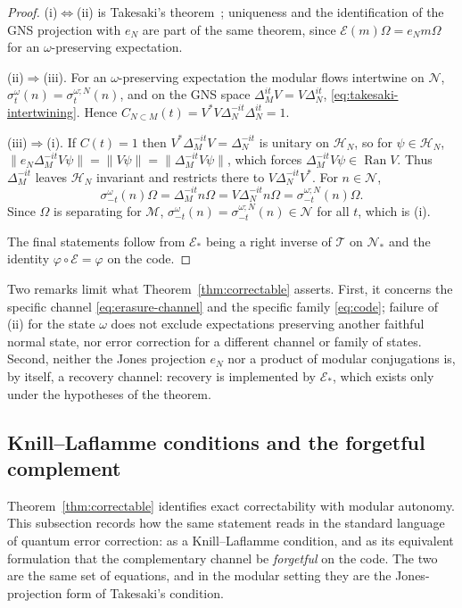 \documentclass[a4paper,11pt]{article}
\theoremstyle{definition}
\newcommand{\mE}{\mathcal{E}}
\begin{document}
\begin{proof}
(i)$\Leftrightarrow$(ii) is Takesaki's theorem~\cite{Takesaki1972}; uniqueness and the identification of the GNS projection with $e_N$ are part of the same theorem, since $\mE(m)\Omega=e_Nm\Omega$ for an $\omega$-preserving expectation.

(ii)$\Rightarrow$(iii). For an $\omega$-preserving expectation the modular flows intertwine on $\mathcal N$,
$\sigma^{\omega}_t(n)=\sigma^{\omega;N}_t(n)$, and on the GNS space
$\Delta_M^{it}V=V\Delta_N^{it}$, \eqref{eq:takesaki-intertwining}. Hence
$C_{N\subset M}(t)=V^*V\Delta_N^{-it}\Delta_N^{it}=1$.

(iii)$\Rightarrow$(i). If $C(t)=1$ then $V^*\Delta_M^{-it}V=\Delta_N^{-it}$ is unitary on $\mathcal H_N$, so for $\psi\in\mathcal H_N$,
$\|e_N\Delta_M^{-it}V\psi\|=\|V\psi\|=\|\Delta_M^{-it}V\psi\|$,
which forces $\Delta_M^{-it}V\psi\in\operatorname{Ran}V$. Thus $\Delta_M^{-it}$ leaves $\mathcal H_N$ invariant and restricts there to $V\Delta_N^{-it}V^*$. For $n\in\mathcal N$,
\[
 \sigma^{\omega}_{-t}(n)\Omega=\Delta_M^{-it}n\Omega
 =V\Delta_N^{-it}n\Omega=\sigma^{\omega;N}_{-t}(n)\Omega .
\]
Since $\Omega$ is separating for $\mathcal M$, $\sigma^{\omega}_{-t}(n)=\sigma^{\omega;N}_{-t}(n)\in\mathcal N$ for all $t$, which is (i).

The final statements follow from $\mE_*$ being a right inverse of $\mathcal T$ on $\mathcal N_*$ and the identity $\varphi\circ\mE=\varphi$ on the code.
\end{proof}

Two remarks limit what Theorem~\ref{thm:correctable} asserts. First, it concerns the specific channel \eqref{eq:erasure-channel} and the specific family \eqref{eq:code}; failure of (ii) for the state $\omega$ does not exclude expectations preserving another faithful normal state, nor error correction for a different channel or family of states. Second, neither the Jones projection $e_N$ nor a product of modular conjugations is, by itself, a recovery channel: recovery is implemented by $\mE_*$, which exists only under the hypotheses of the theorem.



\subsection{Knill--Laflamme conditions and the forgetful complement}\label{subsec:QEC-KL}

Theorem~\ref{thm:correctable} identifies exact correctability with modular autonomy. This subsection records how the same statement reads in the standard language of quantum error correction: as a Knill--Laflamme condition, and as its equivalent formulation that the complementary channel be \emph{forgetful} on the code. The two are the same set of equations, and in the modular setting they are the Jones-projection form of Takesaki's condition.
\end{document}
